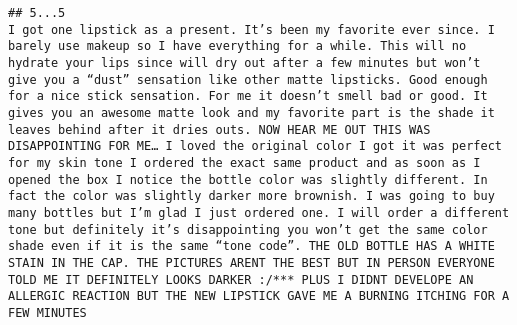 \documentclass[
  11pt,
]{article}
\begin{document}
\begin{verbatim}
## 5...5                                                                                                                                                                                                                                                                                                                                                                                                                                                                                                                                                                                                                                                                                                                                                                                                                I got one lipstick as a present. It’s been my favorite ever since. I barely use makeup so I have everything for a while. This will no hydrate your lips since will dry out after a few minutes but won’t  give you a “dust” sensation like other matte lipsticks. Good enough for a nice stick sensation. For me it doesn’t smell bad or good. It gives you an awesome matte look and my favorite part is the shade it leaves behind after it dries outs. NOW HEAR ME OUT THIS WAS DISAPPOINTING FOR ME… I loved the original color I got it was perfect for my skin tone I ordered the exact same product and as soon as I opened the box I notice the bottle color was slightly different. In fact the color was slightly darker more brownish. I was going to buy many bottles but I’m glad I just ordered one. I will order a different tone but definitely it’s disappointing you won’t get the same color shade even if it is the same “tone code”. THE OLD BOTTLE HAS A WHITE STAIN IN THE CAP. THE PICTURES ARENT THE BEST BUT IN PERSON EVERYONE TOLD ME IT DEFINITELY LOOKS DARKER :/*** PLUS I DIDNT DEVELOPE AN ALLERGIC REACTION BUT THE NEW LIPSTICK GAVE ME A BURNING ITCHING FOR A FEW MINUTES

\end{verbatim}
\end{document}
